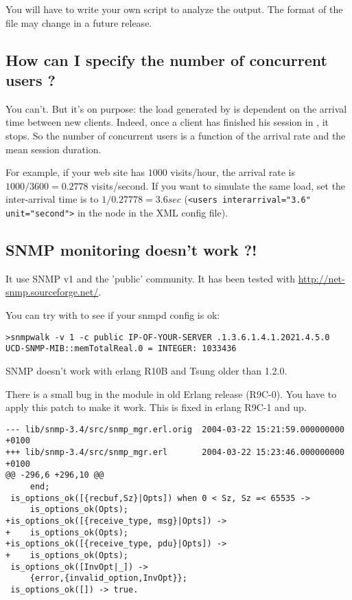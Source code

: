 \documentclass{TSUNG-en}
\begin{document}
\begin{appendix}
You will have to write your own script to analyze the output.
The format of the file may change in a future release.


\subsection{How can I specify the number of concurrent users ?}

You can't. But it's on purpose: the load generated by
 is dependent on the arrival time between new
clients. Indeed, once a client has finished his session in
, it stops. So the number of concurrent users is
a function of the arrival rate and the mean session duration.

For example, if your web site has $1000$ visits/hour, the arrival rate
is $1000/3600 = 0.2778$ visits/second. If you want to simulate the same
load, set the inter-arrival time is to $1/0.27778 = 3.6 sec$ (\texttt{<users
interarrival="3.6" unit="second">} in the  node in the
XML config file).

\subsection{SNMP monitoring doesn't work ?!}
\label{sec:faq:snmp}
It use SNMP v1 and the 'public' community. It has been tested with
\url{http://net-snmp.sourceforge.net/}.

You can try with  to see if your snmpd config is ok:

\begin{Verbatim}
>snmpwalk -v 1 -c public IP-OF-YOUR-SERVER .1.3.6.1.4.1.2021.4.5.0
UCD-SNMP-MIB::memTotalReal.0 = INTEGER: 1033436
\end{Verbatim}

SNMP doesn't work with erlang R10B and Tsung older than 1.2.0.

There is a small bug in the  module in old Erlang
release (R9C-0). You have to apply this patch to make it
work. This is fixed in erlang R9C-1 and up.


\begin{Verbatim}
--- lib/snmp-3.4/src/snmp_mgr.erl.orig  2004-03-22 15:21:59.000000000 +0100
+++ lib/snmp-3.4/src/snmp_mgr.erl       2004-03-22 15:23:46.000000000 +0100
@@ -296,6 +296,10 @@
     end;
 is_options_ok([{recbuf,Sz}|Opts]) when 0 < Sz, Sz =< 65535 ->
     is_options_ok(Opts);
+is_options_ok([{receive_type, msg}|Opts]) ->
+    is_options_ok(Opts);
+is_options_ok([{receive_type, pdu}|Opts]) ->
+    is_options_ok(Opts);
 is_options_ok([InvOpt|_]) ->
     {error,{invalid_option,InvOpt}};
 is_options_ok([]) -> true.
\end{Verbatim}


\end{appendix}
\end{document}
